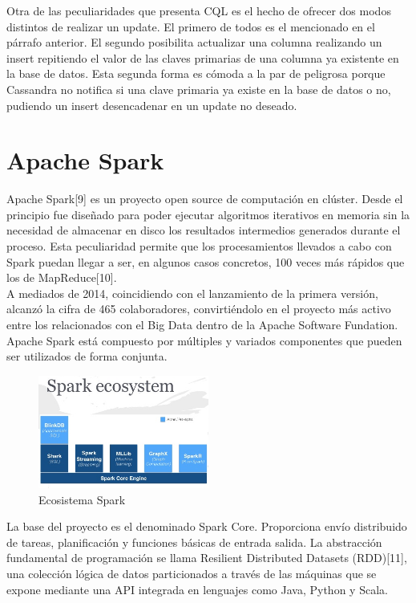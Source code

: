 Otra de las peculiaridades que presenta CQL es el hecho de ofrecer dos modos distintos de realizar un update. El primero de todos es el mencionado en el párrafo anterior. El segundo posibilita actualizar una columna realizando un insert repitiendo el valor de las claves primarias de una columna ya existente en la base de datos. Esta segunda forma es cómoda a la par de peligrosa porque Cassandra no notifica si una clave primaria ya existe en la base de datos o no, pudiendo un insert desencadenar en un update no deseado.  

\section{Apache Spark}

Apache Spark[9] es un proyecto open source de computación en clúster. Desde el principio fue diseñado para poder ejecutar algoritmos iterativos en memoria sin la necesidad de almacenar en disco los resultados intermedios generados durante el proceso. Esta peculiaridad permite que los procesamientos llevados a cabo con Spark puedan llegar a ser, en algunos casos concretos, 100 veces más rápidos que los de MapReduce[10].\\

A mediados de 2014, coincidiendo con el lanzamiento de la primera versión, alcanzó la cifra de 465 colaboradores, convirtiéndolo en el proyecto más activo entre los relacionados con el Big Data dentro de la Apache Software Fundation.\\

Apache Spark está compuesto por múltiples y variados componentes que pueden ser utilizados de forma conjunta.\\

\begin{figure}[h]
	\centering
	\includegraphics[width=0.5\textwidth]{Ilustraciones/spark_ecosystem.png}
	\caption{Ecosistema Spark}
	\label{fig:ipanel}
\end{figure}

La base del proyecto es el denominado Spark Core. Proporciona envío distribuido de tareas, planificación y funciones básicas de entrada salida. La abstracción fundamental de programación se llama Resilient Distributed Datasets (RDD)[11], una colección lógica de datos particionados a través de las máquinas que se expone mediante una API integrada en lenguajes como Java, Python y Scala.\\

